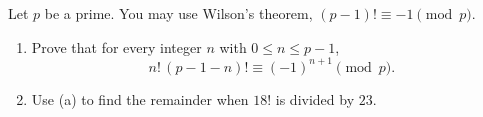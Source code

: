 Let $p$ be a prime. You may use Wilson's theorem, $(p-1)!\equiv-1\pmod p$.
\begin{enumerate}
\item[(a)] Prove that for every integer $n$ with $0\le n\le p-1$,
\[n!\,(p-1-n)!\equiv(-1)^{n+1}\pmod p .\]
\item[(b)] Use (a) to find the remainder when $18!$ is divided by $23$.
\end{enumerate}
